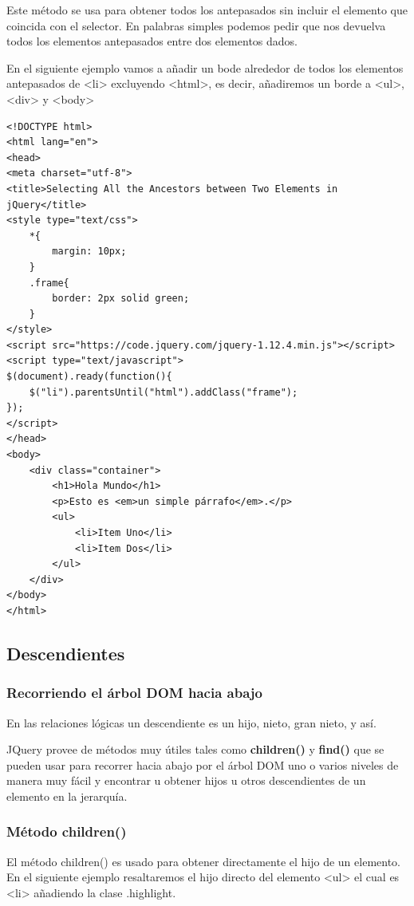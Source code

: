 \documentclass[a4paper, oneside]{article}
\begin{document}
Este método se usa para obtener todos los antepasados sin incluir el elemento que coincida con el selector. En palabras simples podemos pedir que nos devuelva todos los elementos antepasados entre dos elementos dados.

En el siguiente ejemplo vamos a añadir un bode alrededor de todos los elementos antepasados de <li> excluyendo <html>, es decir, añadiremos un borde a <ul>, <div> y <body>

\begin{verbatim}
<!DOCTYPE html>
<html lang="en">
<head>
<meta charset="utf-8">
<title>Selecting All the Ancestors between Two Elements in jQuery</title>
<style type="text/css">
    *{
        margin: 10px;
    }
    .frame{
        border: 2px solid green;
    }        
</style>
<script src="https://code.jquery.com/jquery-1.12.4.min.js"></script>
<script type="text/javascript">
$(document).ready(function(){
    $("li").parentsUntil("html").addClass("frame");
});
</script>
</head>
<body>
    <div class="container">
        <h1>Hola Mundo</h1>
        <p>Esto es <em>un simple párrafo</em>.</p>
        <ul>
            <li>Item Uno</li>
            <li>Item Dos</li>
        </ul>
    </div>
</body>
</html>                                		
\end{verbatim}

\subsection{Descendientes}
\label{sec:orgebffb1e}

\subsubsection{Recorriendo el árbol DOM hacia abajo}
\label{sec:orgb77b33c}

En las relaciones lógicas un descendiente es un hijo, nieto, gran nieto, y así.

JQuery provee de métodos muy útiles tales como \textbf{children()} y \textbf{find()} que se pueden usar para recorrer hacia abajo por el árbol DOM uno o varios niveles de manera muy fácil y encontrar u obtener hijos u otros descendientes de un elemento en la jerarquía.

\subsubsection{Método children()}
\label{sec:org286d049}

El método children() es usado para obtener directamente el hijo de un elemento. En el siguiente ejemplo resaltaremos el hijo directo del elemento <ul> el cual es <li> añadiendo la clase .highlight. 
\end{document}
